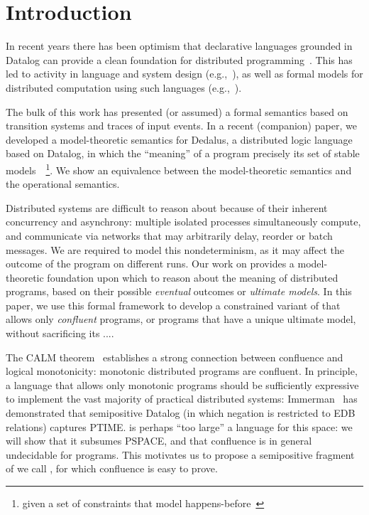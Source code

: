 \section{Introduction}

In recent years there has been optimism that declarative languages grounded in
Datalog can provide a clean foundation for distributed
programming~\cite{declarative-imperative}.  This has led to activity in language
and system design (e.g.,~\cite{boom,Belaramani:2009,Chu:2007,Loo2009-CACM}), as well as formal
models for distributed computation using such
languages (e.g.,~\cite{relational-transducers,navarro-oper-sem,card-abstraction}).

The bulk of this work has presented (or assumed) a formal semantics based on transition systems
and traces of input events. 
In a recent (companion) paper, we developed a model-theoretic 
semantics for Dedalus, a distributed logic language based on Datalog, in which the ``meaning''
of a program precisely its set of stable models~\cite{zaniolo}~\footnote{given a set of constraints that 
model happens-before~\cite{lamport}}.  We show an equivalence between the model-theoretic semantics
and the operational semantics.

Distributed systems are difficult to reason about because of their inherent concurrency and asynchrony: multiple 
isolated processes simultaneously compute, and communicate via networks that may arbitrarily delay, reorder or batch messages.
We are required to model this nondeterminism, as it may affect the outcome of the program on different runs.  Our work on
\lang provides a model-theoretic foundation upon which to reason about the meaning of distributed programs, based on their possible 
\emph{eventual} outcomes or \emph{ultimate models}.  In this paper, we use this formal framework to develop a constrained variant
of \lang that allows only \emph{confluent} programs, or programs that have a unique ultimate model, without sacrificing its ....

The CALM theorem~\cite{calm, ameloot, imperative, ameloot} establishes a strong connection between confluence
and logical monotonicity: monotonic distributed programs are confluent.  In principle, a language that allows only
monotonic programs should be sufficiently expressive to implement the vast majority of practical distributed systems:
Immerman~\cite{??} has demonstrated that semipositive Datalog (in which negation is restricted to EDB relations) captures PTIME.  
\lang is perhaps ``too large'' a language for this space: we will show that it subsumes PSPACE, and that confluence is in general
undecidable for \lang programs.  This motivates us to propose a semipositive fragment of \lang we call \slang, 
for which confluence is easy to prove.

